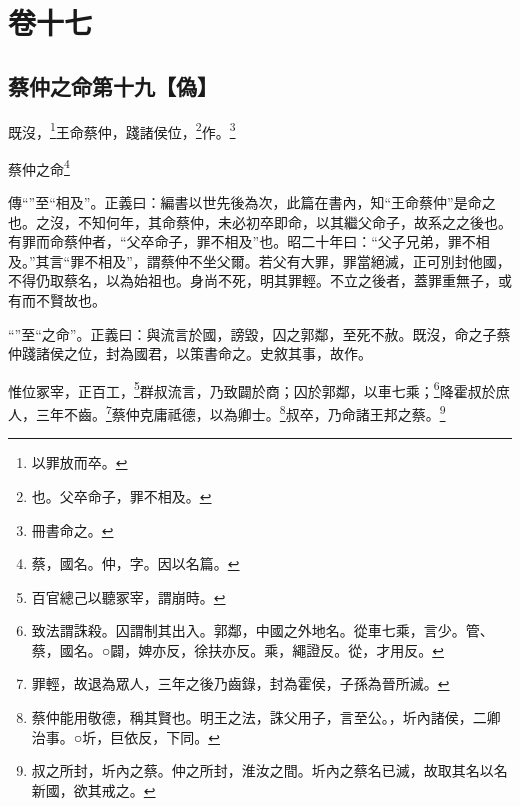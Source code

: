 

\chapter{卷十七}


\section{蔡仲之命第十九【偽】}


既沒，\footnote{以罪放而卒。}王命蔡仲，踐諸侯位，\footnote{也。父卒命子，罪不相及。}作。\footnote{冊書命之。}

蔡仲之命\footnote{蔡，國名。仲，字。因以名篇。}


{\noindent\zhuan{}\fzbyks 傳“”至“相及”。正義曰：編書以世先後為次，此篇在書內，知“王命蔡仲”是命之也。之沒，不知何年，其命蔡仲，未必初卒即命，以其繼父命子，故系之之後也。有罪而命蔡仲者，“父卒命子，罪不相及”也。昭二十年曰：“父子兄弟，罪不相及。”其言“罪不相及”，謂蔡仲不坐父爾。若父有大罪，罪當絕滅，正可別封他國，不得仍取蔡名，以為始祖也。身尚不死，明其罪輕。不立之後者，蓋罪重無子，或有而不賢故也。 \par}

{\noindent\shu{}\fzkt “”至“之命”。正義曰：與流言於國，謗毀，囚之郭鄰，至死不赦。既沒，命之子蔡仲踐諸侯之位，封為國君，以策書命之。史敘其事，故作。 \par}

惟位冢宰，正百工，\footnote{百官總己以聽冢宰，謂崩時。}群叔流言，乃致闢於商；囚於郭鄰，以車七乘；\footnote{致法謂誅殺。囚謂制其出入。郭鄰，中國之外地名。從車七乘，言少。管、蔡，國名。○闢，婢亦反，徐扶亦反。乘，繩證反。從，才用反。}降霍叔於庶人，三年不齒。\footnote{罪輕，故退為眾人，三年之後乃齒錄，封為霍侯，子孫為晉所滅。}蔡仲克庸祗德，以為卿士。\footnote{蔡仲能用敬德，稱其賢也。明王之法，誅父用子，言至公。，圻內諸侯，二卿治事。○圻，巨依反，下同。}叔卒，乃命諸王邦之蔡。\footnote{叔之所封，圻內之蔡。仲之所封，淮汝之間。圻內之蔡名已滅，故取其名以名新國，欲其戒之。}


